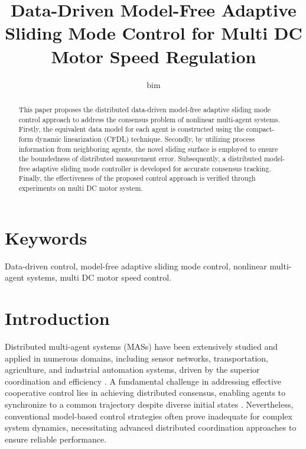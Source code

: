 \documentclass[journal,onecolumn]{IEEEtran}
\title{\LARGE Data-Driven Model-Free Adaptive Sliding Mode Control for Multi DC Motor Speed Regulation}
\author{bim}
\begin{document}
\maketitle

\begin{abstract}
    This paper proposes the distributed data-driven model-free adaptive sliding mode control approach to address the consensus problem of nonlinear multi-agent systems. Firstly, the equivalent data model for each agent is constructed using the compact-form dynamic linearization (CFDL) technique. Secondly, by utilizing process information from neighboring agents, the novel sliding surface is employed to ensure the boundedness of distributed measurement error. Subsequently, a distributed model-free adaptive sliding mode controller is developed for accurate consensus tracking. Finally, the effectiveness of the proposed control approach is verified through experiments on multi DC motor system.
\end{abstract}


\section*{Keywords}
Data-driven control, model-free adaptive sliding mode control, nonlinear multi-agent systems, multi DC motor speed control.

\section{Introduction}\label{section:1}


Distributed multi-agent systems (MASs) have been extensively studied and applied in numerous domains, including sensor networks, transportation, agriculture, and industrial automation systems, driven by the superior coordination and efficiency \cite{1,2,3}. A fundamental challenge in addressing effective cooperative control lies in achieving distributed consensus, enabling agents to synchronize to a common trajectory despite diverse initial states \cite{4,5,6}. Nevertheless, conventional model-based control strategies often prove inadequate for complex system dynamics, necessitating advanced distributed coordination approaches to ensure reliable performance. 
\end{document}
